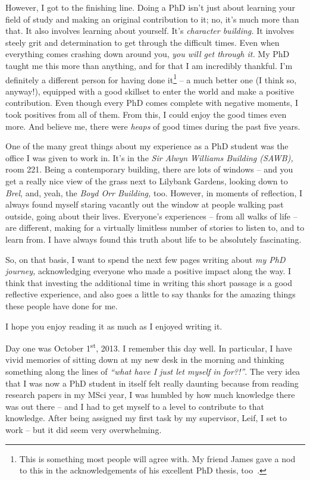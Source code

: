 \begin{preamble}
However, I got to the finishing line. Doing a PhD isn't just about learning your field of study and making an original contribution to it; no, it's much more than that. It also involves learning about yourself. It's \emph{character building.} It involves steely grit and determination to get through the difficult times. Even when everything comes crashing down around you, \emph{you will get through it.} My PhD taught me this more than anything, and for that I am incredibly thankful. I'm definitely a different person for having done it\footnote{This is something most people will agree with. My friend James gave a nod to this in the acknowledgements of his excellent PhD thesis, too~\citep{mcminn2018phd}.} -- a much better one (I think so, anyway!), equipped with a good skillset to enter the world and make a positive contribution. Even though every PhD comes complete with negative moments, I took positives from all of them. From this, I could enjoy the good times even more. And believe me, there were \emph{heaps} of good times during the past five years.

One of the many great things about my experience as a PhD student was the office I was given to work in. It's in the \emph{Sir Alwyn Williams Building (SAWB),} room 221. Being a contemporary building, there are lots of windows -- and you get a really nice view of the grass next to Lilybank Gardens, looking down to \emph{Brel}, and, yeah, the \emph{Boyd Orr Building,} too. However, in moments of reflection, I always found myself staring vacantly out the window at people walking past outside, going about their lives. Everyone's experiences -- from all walks of life -- are different, making for a virtually limitless number of stories to listen to, and to learn from. I have always found this truth about life to be absolutely fascinating.

So, on that basis, I want to spend the next few pages writing about \emph{my PhD journey,} acknowledging everyone who made a positive impact along the way. I think that investing the additional time in writing this short passage is a good reflective experience, and also goes a little to say thanks for the amazing things these people have done for me.

I hope you enjoy reading it as much as I enjoyed writing it.


Day one was October 1\textsuperscript{st}, 2013. I remember this day well. In particular, I have vivid memories of sitting down at my new desk in the morning and thinking something along the lines of \emph{``what have I just let myself in for?!''}. The very idea that I was now a PhD student in itself felt really daunting because from reading research papers in my MSci year, I was humbled by how much knowledge there was out there -- and I had to get myself to a level to contribute to that knowledge. After being assigned my first task by my supervisor, Leif, I set to work -- but it did seem very overwhelming.


\end{preamble}
